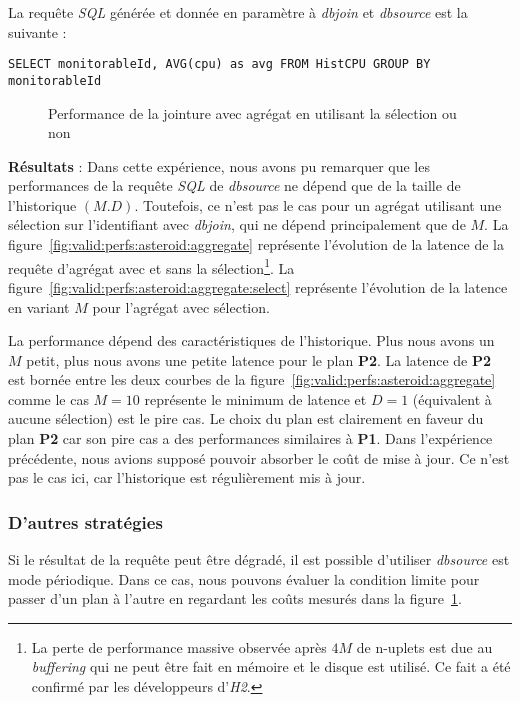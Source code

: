 La requête \textit{SQL} générée et donnée en paramètre à \textit{dbjoin} et \textit{dbsource} est la suivante : 
\begin{lstlisting}
SELECT monitorableId, AVG(cpu) as avg FROM HistCPU GROUP BY monitorableId
\end{lstlisting}

\begin{figure}[ht]
\caption{Performance de la jointure avec agrégat en utilisant la sélection ou non}\label{fig:valid:perfs:asteroid:agg}
\end{figure}

\textbf{Résultats} : Dans cette expérience, nous avons pu remarquer que les performances de la requête \textit{SQL} de \textit{dbsource} ne dépend que de la taille de l'historique $(M.D)$. Toutefois, ce n'est pas le cas pour un agrégat utilisant une sélection sur l'identifiant avec \textit{dbjoin}, qui ne dépend principalement que de $M$. La figure~\ref{fig:valid:perfs:asteroid:aggregate} représente l'évolution de la latence de la requête d'agrégat avec et sans la sélection\footnote{La perte de performance massive observée après $4M$ de n-uplets est due au \textit{buffering} qui ne peut être fait en mémoire et le disque est utilisé. Ce fait a été confirmé par les développeurs d'\textit{H2}.}. La figure~\ref{fig:valid:perfs:asteroid:aggregate:select} représente l'évolution de la latence en variant $M$ pour l'agrégat avec sélection.

La performance dépend des caractéristiques de l'historique. Plus nous avons un $M$ petit, plus nous avons une petite latence pour le plan \textbf{P2}. La latence de \textbf{P2} est bornée entre les deux courbes de la figure~\ref{fig:valid:perfs:asteroid:aggregate} comme le cas $M=10$ représente le minimum de latence et $D=1$ (équivalent à aucune sélection) est le pire cas. Le choix du plan est clairement en faveur du plan \textbf{P2} car son pire cas a des performances similaires à \textbf{P1}. Dans l'expérience précédente, nous avions supposé pouvoir absorber le coût de mise à jour. Ce n'est pas le cas ici, car l'historique est régulièrement mis à jour.

\subsubsection{D'autres stratégies}
Si le résultat de la requête peut être dégradé, il est possible d'utiliser \textit{dbsource} est mode périodique. Dans ce cas, nous pouvons évaluer la condition limite pour passer d'un plan à l'autre en regardant les coûts mesurés dans la figure~\ref{fig:valid:perfs:asteroid:agg}.

